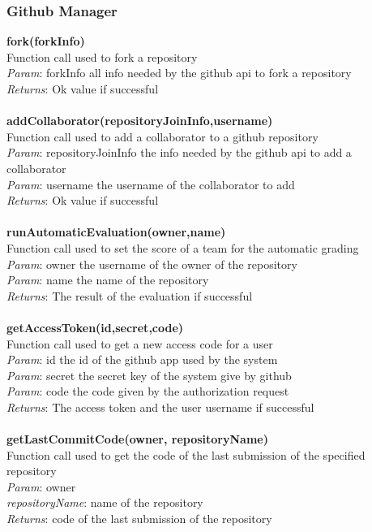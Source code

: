 \documentclass{article}
\begin{document}
\subsubsection{Github Manager}
\textbf{fork(forkInfo)}\\
Function call used to fork a repository\\
\textit{Param}: forkInfo all info needed by the github api to fork a repository\\
\textit{Returns}: Ok value if successful\\
\\
\textbf{addCollaborator(repositoryJoinInfo,username)}\\
Function call used to add a collaborator to a github repository\\
\textit{Param}: repositoryJoinInfo the info needed by the github api to add a collaborator\\
\textit{Param}: username the username of the collaborator to add\\
\textit{Returns}: Ok value if successful\\
\\
\textbf{runAutomaticEvaluation(owner,name)}\\
Function call used to set the score of a team for the automatic grading\\
\textit{Param}: owner the username of the owner of the repository\\
\textit{Param}: name the name of the repository\\
\textit{Returns}: The result of the evaluation if successful\\
\\
\textbf{getAccessToken(id,secret,code)}\\
Function call used to get a new access code for a user\\
\textit{Param}: id the id of the github app used by the system\\
\textit{Param}: secret the secret key of the system give by github\\
\textit{Param}: code the code given by the authorization request\\
\textit{Returns}: The access token and the user username if successful\\
\\
\textbf{getLastCommitCode(owner, repositoryName)}\\
Function call used to get the code of the last submission of the specified repository\\
\textit{Param}: owner\\
\textit{repositoryName}: name of the repository\\
\textit{Returns}: code of the last submission of the repository\\
\end{document}
